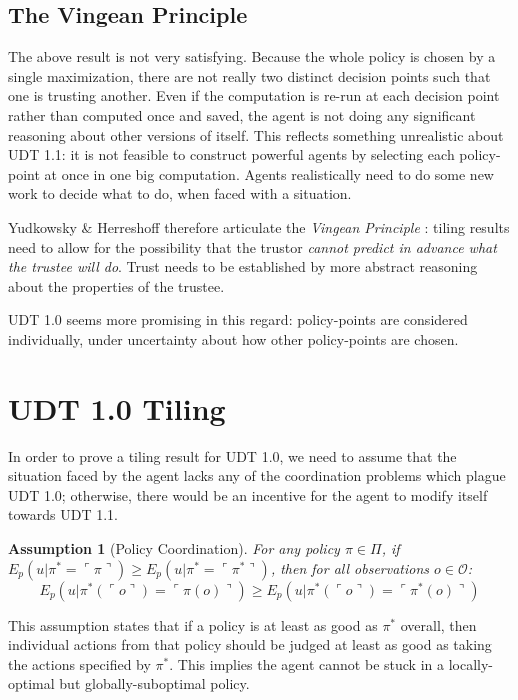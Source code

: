 \documentclass{article}
\newcommand{\qq}[1]{\ulcorner #1 \urcorner}
\newtheorem{assumption}{Assumption}
\begin{document}
\subsection{The Vingean Principle}

The above result is not very satisfying. Because the whole policy is chosen by a single maximization, there are not really two distinct decision points such that one is trusting another. Even if the computation is re-run at each decision point rather than computed once and saved, the agent is not doing any significant reasoning about other versions of itself. This reflects something unrealistic about UDT 1.1: it is not feasible to construct powerful agents by selecting each policy-point at once in one big computation. Agents realistically need to do some new work to decide what to do, when faced with a situation.

Yudkowsky \& Herreshoff therefore articulate the \emph{Vingean Principle} \cite{yudkowsky2013tiling}: tiling results need to allow for the possibility that the trustor \emph{cannot predict in advance what the trustee will do}. Trust needs to be established by more abstract reasoning about the properties of the trustee.

UDT 1.0 seems more promising in this regard: policy-points are considered individually, under uncertainty about how other policy-points are chosen.

\section{UDT 1.0 Tiling}

In order to prove a tiling result for UDT 1.0, we need to assume that the situation faced by the agent lacks any of the coordination problems which plague UDT 1.0; otherwise, there would be an incentive for the agent to modify itself towards UDT 1.1.

\begin{assumption}[Policy Coordination]
For any policy $\pi \in \Pi$, if $E_p(u|\pi^*=\qq{\pi}) \geq E_p(u|\pi^*=\qq{\pi^*})$, then for all observations $o \in \mathcal{O}$:
$$ E_p(u|\pi^*(\qq{o})=\qq{\pi(o)}) \geq E_p(u|\pi^*(\qq{o})=\qq{\pi^*(o)}) $$
\end{assumption}

This assumption states that if a policy is at least as good as $\pi^*$ overall, then  individual actions from that policy should be judged at least as good as taking the actions specified by $\pi^*$. This implies the agent cannot be stuck in a locally-optimal but globally-suboptimal policy.
\end{document}

